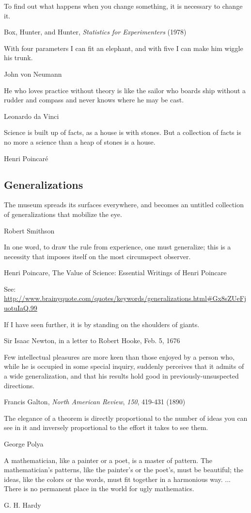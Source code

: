 \epigraph{To find out what happens when you change something, it is necessary to change it.}{Box, Hunter, and Hunter, \emph{Statistics for Experimenters} (1978)}

\epigraph{With four parameters I can fit an elephant, and with five I can make him wiggle his trunk. }{John von Neumann}

\epigraph{He who loves practice without theory is like the sailor who boards ship without a rudder and compass and never knows where he may be cast.}{Leonardo da Vinci}	

\epigraph{Science is built up of facts, as a house is with stones. But a collection of facts is no more a science than a heap of stones is a house.}{Henri Poincar\'e}
\subsection{Generalizations}
\epigraph{The museum spreads its surfaces everywhere, and becomes an untitled collection of generalizations that mobilize the eye.}{Robert Smithson}

\epigraph{In one word, to draw the rule from experience, one must generalize; this is a necessity that imposes itself on the most circumspect observer.}{Henri Poincare, The Value of Science: Essential Writings of Henri Poincare}


See: \url{http://www.brainyquote.com/quotes/keywords/generalizations.html#Gx8sZUeFjuotuIaQ.99}

\epigraph{If I have seen further, it is by standing on the shoulders of giants.}{Sir Isaac Newton, in a letter to Robert Hooke, Feb. 5, 1676}

\epigraph{Few intellectual pleasures are more keen than those enjoyed by a person who, while he is occupied in some special inquiry, suddenly perceives that it admits of a wide generalization, and that his results hold good in previously-unsuspected directions.}{Francis Galton, \emph{North American Review}, \emph{150}, 419-431 (1890)}

\epigraph{The elegance of a theorem is directly proportional to the number of ideas you can see in it and inversely proportional to the effort it takes to see them.}{George Polya}

\epigraph{A mathematician, like a painter or a poet, is a master of pattern. The mathematician's patterns, like the painter's or the poet's, must be beautiful; the ideas, like the colors or the words, must fit together in a harmonious way. ... There is no permanent place in the world for ugly mathematics.}{G. H. Hardy}

